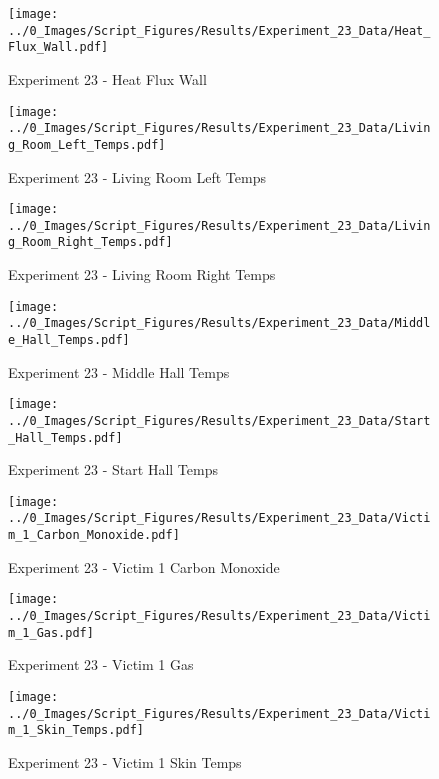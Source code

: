 	\clearpage

	\begin{figure}[H]
		\centering
		\texttt{[image: ../0\_Images/Script\_Figures/Results/Experiment\_23\_Data/Heat\_Flux\_Wall.pdf]}
		\caption[]{Experiment 23 - Heat Flux Wall}
	\end{figure}
 

	\begin{figure}[H]
		\centering
		\texttt{[image: ../0\_Images/Script\_Figures/Results/Experiment\_23\_Data/Living\_Room\_Left\_Temps.pdf]}
		\caption[]{Experiment 23 - Living Room Left Temps}
	\end{figure}
 
	\clearpage

	\begin{figure}[H]
		\centering
		\texttt{[image: ../0\_Images/Script\_Figures/Results/Experiment\_23\_Data/Living\_Room\_Right\_Temps.pdf]}
		\caption[]{Experiment 23 - Living Room Right Temps}
	\end{figure}
 

	\begin{figure}[H]
		\centering
		\texttt{[image: ../0\_Images/Script\_Figures/Results/Experiment\_23\_Data/Middle\_Hall\_Temps.pdf]}
		\caption[]{Experiment 23 - Middle Hall Temps}
	\end{figure}
 
	\clearpage

	\begin{figure}[H]
		\centering
		\texttt{[image: ../0\_Images/Script\_Figures/Results/Experiment\_23\_Data/Start\_Hall\_Temps.pdf]}
		\caption[]{Experiment 23 - Start Hall Temps}
	\end{figure}
 

	\begin{figure}[H]
		\centering
		\texttt{[image: ../0\_Images/Script\_Figures/Results/Experiment\_23\_Data/Victim\_1\_Carbon\_Monoxide.pdf]}
		\caption[]{Experiment 23 - Victim 1 Carbon Monoxide}
	\end{figure}
 
	\clearpage

	\begin{figure}[H]
		\centering
		\texttt{[image: ../0\_Images/Script\_Figures/Results/Experiment\_23\_Data/Victim\_1\_Gas.pdf]}
		\caption[]{Experiment 23 - Victim 1 Gas}
	\end{figure}
 

	\begin{figure}[H]
		\centering
		\texttt{[image: ../0\_Images/Script\_Figures/Results/Experiment\_23\_Data/Victim\_1\_Skin\_Temps.pdf]}
		\caption[]{Experiment 23 - Victim 1 Skin Temps}
	\end{figure}
 
